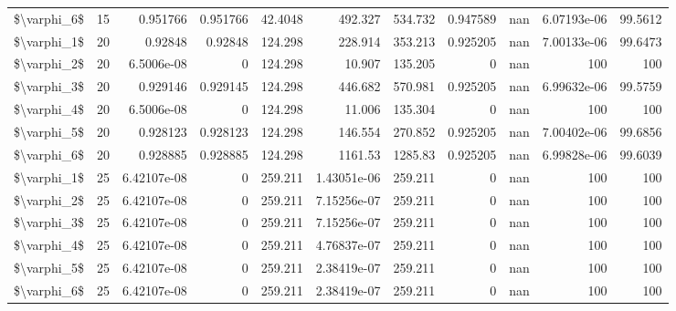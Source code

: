 \begin{tabular}{lrrrrrrrrrr}
 \$\textbackslash{}varphi\_6\$ &  15 & 0.951766    & 0.951766 &     42.4048 &  492.327       &     534.732  &     0.947589 &         nan &   6.07193e-06 &  99.5612      \\
 \$\textbackslash{}varphi\_1\$ &  20 & 0.92848     & 0.92848  &    124.298  &  228.914       &     353.213  &     0.925205 &         nan &   7.00133e-06 &  99.6473      \\
 \$\textbackslash{}varphi\_2\$ &  20 & 6.5006e-08  & 0        &    124.298  &   10.907       &     135.205  &     0        &         nan & 100           & 100           \\
 \$\textbackslash{}varphi\_3\$ &  20 & 0.929146    & 0.929145 &    124.298  &  446.682       &     570.981  &     0.925205 &         nan &   6.99632e-06 &  99.5759      \\
 \$\textbackslash{}varphi\_4\$ &  20 & 6.5006e-08  & 0        &    124.298  &   11.006       &     135.304  &     0        &         nan & 100           & 100           \\
 \$\textbackslash{}varphi\_5\$ &  20 & 0.928123    & 0.928123 &    124.298  &  146.554       &     270.852  &     0.925205 &         nan &   7.00402e-06 &  99.6856      \\
 \$\textbackslash{}varphi\_6\$ &  20 & 0.928885    & 0.928885 &    124.298  & 1161.53        &    1285.83   &     0.925205 &         nan &   6.99828e-06 &  99.6039      \\
 \$\textbackslash{}varphi\_1\$ &  25 & 6.42107e-08 & 0        &    259.211  &    1.43051e-06 &     259.211  &     0        &         nan & 100           & 100           \\
 \$\textbackslash{}varphi\_2\$ &  25 & 6.42107e-08 & 0        &    259.211  &    7.15256e-07 &     259.211  &     0        &         nan & 100           & 100           \\
 \$\textbackslash{}varphi\_3\$ &  25 & 6.42107e-08 & 0        &    259.211  &    7.15256e-07 &     259.211  &     0        &         nan & 100           & 100           \\
 \$\textbackslash{}varphi\_4\$ &  25 & 6.42107e-08 & 0        &    259.211  &    4.76837e-07 &     259.211  &     0        &         nan & 100           & 100           \\
 \$\textbackslash{}varphi\_5\$ &  25 & 6.42107e-08 & 0        &    259.211  &    2.38419e-07 &     259.211  &     0        &         nan & 100           & 100           \\
 \$\textbackslash{}varphi\_6\$ &  25 & 6.42107e-08 & 0        &    259.211  &    2.38419e-07 &     259.211  &     0        &         nan & 100           & 100           \\

\end{tabular}

